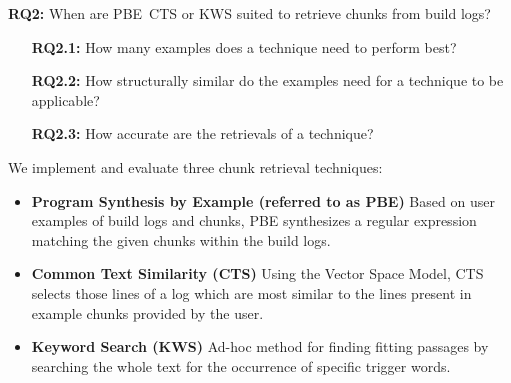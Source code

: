 \begin{simplebox}{\textbf{RQ2:} When are PBE\, CTS or KWS suited to
retrieve chunks from build logs?}
\begin{itemize}
  \item[\textbf{RQ2.1:}] How many examples does a technique need to
  perform best?
  \item[\textbf{RQ2.2:}] How structurally similar do the examples
  need for a technique to be applicable?
  \item[\textbf{RQ2.3:}] How accurate are the retrievals of a technique?
\end{itemize}
\end{simplebox}



We implement and evaluate three chunk retrieval techniques:
\begin{itemize}
  \item \textbf{Program Synthesis by Example (referred to as PBE)}
  Based on user examples of build logs and chunks, PBE
  synthesizes
  a regular expression matching the given chunks within the build logs.
  \item \textbf{Common Text Similarity (CTS)}
  Using the Vector Space Model, CTS selects those lines of a log which are
  most similar to the lines present in example chunks provided by
  the user.
  \item \textbf{Keyword Search (KWS)}
  Ad-hoc method for finding fitting passages by searching the whole
  text for
  the occurrence of specific trigger words.
\end{itemize}

